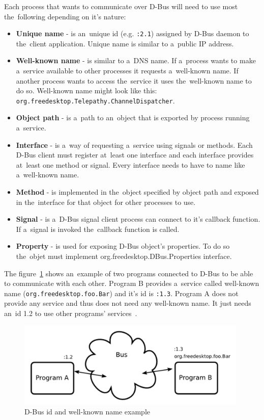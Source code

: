 Each process that wants to communicate over D-Bus will need to use most the~following depending on it's nature: 
\begin{itemize}
	\item {\bf Unique name} - is an~unique id (e.g. \verb|:2.1|) assigned by D-Bus daemon to the~client application. Unique name is similar to a~public IP address.
	\item {\bf Well-known name} - is similar to a~DNS name. If a~process wants to make a~service available to other processes it requests a~well-known name. If another process wants to access the~service it uses the~well-known name to do so. Well-known name might look like this: \verb|org.freedesktop.Telepathy.ChannelDispatcher|.    
	\item {\bf Object path} - is a~path to an~object that is exported by process running a~service.
	\item {\bf Interface} - is a~way of requesting a~service using signals or methods. Each D-Bus client must register at~least one interface and each interface provides at~least one method or signal. Every interface needs to have to name like a~well-known name.  
	\item {\bf Method} - is implemented in the~object specified by object path and exposed in the~interface for that object for other processes to use. 
	\item {\bf Signal} - is a~D-Bus signal client process can connect to it's callback function. If a~signal is invoked the~callback function is called.
	\item {\bf Property} - is used for exposing D-Bus object's properties. To do so the~objet must implement org.freedesktop.DBus.Properties interface.
\end{itemize}

The figure~\ref{fig:dbusArchitectureNames} shows an~example of two programs connected to D-Bus to be able to communicate with each other. Program B provides a~service called well-known name (\verb|org.freedesktop.foo.Bar|) and it's id is \verb|:1.3|. Program A does not provide any service and thus does not need any well-known name. It just needs an~id 1.2 to use other programs' services~\cite{TPWiki}.

\begin{figure}[ht]
\begin{center}
	\includegraphics[width=11cm]{fig/dbus-architecture-names.png}
	\caption{D-Bus id and well-known name example~\cite{TPWiki}}
	\label{fig:dbusArchitectureNames}
\end{center}
\end{figure}


